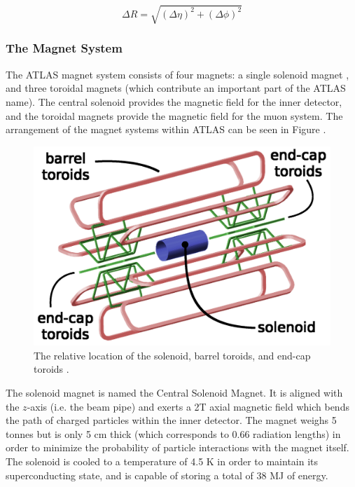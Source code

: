 \documentclass[12pt,a4paper,epsf,portrait,times,epsfig]{article}
\begin{document}
		\begin{equation}
			\Delta R = \sqrt{ (\Delta\eta)^{2} + (\Delta\phi)^{2} }
		\end{equation}


		\subsubsection{The Magnet System}

		The ATLAS magnet system consists of four magnets: a single solenoid magnet \cite{ATLASSolenoidMagnet}, and three toroidal magnets \cite{ATLASBarrelToroid, ATLASEndcapToroid} (which contribute an important part of the ATLAS name). The central solenoid provides the magnetic field for the inner detector, and the toroidal magnets provide the magnetic field	for the muon system. The arrangement of the magnet systems within ATLAS can be seen in Figure . \par

		\begin{figure}
			\centering
			\includegraphics[scale=0.15]{Magnet_Layout.png}
			\caption{The relative location of the solenoid, barrel toroids, and end-cap toroids \cite{ATLASToroids}. }
			\label{Fig:CernMagneticLayout}
		\end{figure}

		The solenoid magnet is named the Central Solenoid Magnet. It is aligned with the $z$-axis (i.e. the beam pipe) and exerts a 2T axial magnetic field which bends the path of charged particles within the inner detector. The magnet weighs 5 tonnes but is only 5 cm thick (which corresponds to 0.66 radiation lengths) in order to minimize the probability of particle interactions with the magnet itself. The solenoid is cooled to a temperature of 4.5 K in order to maintain its superconducting state, and is capable of storing a total of 38 MJ of energy. \par
		
\end{document}
